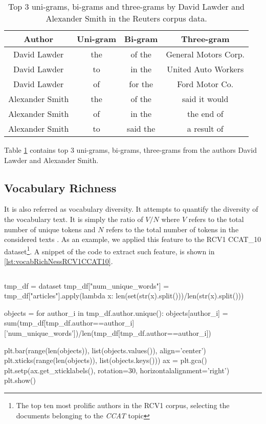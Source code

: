 \begin{table}[h!]
	\begin{center}  
		\caption[Top 3 n-grams in Reuters Corpus]{Top 3 uni-grams, bi-grams and three-grams by David Lawder and Alexander Smith in the Reuters corpus data.} 
		\label{tab:tableNGramsRCV1}
		\begin{tabular}{|c | c | c | c|}
			\hline 
			Author & Uni-gram & Bi-gram & Three-gram \\
			\hline \hline
			David Lawder & the & of the & General Motors Corp. \\ \hline
			David Lawder & to & in the	& United Auto Workers \\ \hline
			David Lawder & of & for the	& Ford Motor Co. \\ \hline
			Alexander Smith & the & of the & said it would \\ \hline
			Alexander Smith & of & in the	& the end of \\ \hline
			Alexander Smith & to & said the	& a result of \\ \hline
		\end{tabular} 
	\end{center}
\end{table}

Table \ref{tab:tableNGramsRCV1} contains top 3 uni-grams, bi-grams, three-grams from the authors David Lawder and Alexander Smith.

\subsection{Vocabulary Richness}
It is also referred as vocabulary diversity. It attempts to quantify the diversity of the vocabulary text. It is simply the ratio of $V / N$ where $V$ refers to the total number of unique tokens and $N$ refers to the total number of tokens in the considered texts \cite{stamatatos2009survey}. As an example, we applied this feature to the RCV1 CCAT\_10 dataset\footnote{The top ten most prolific authors in the RCV1 corpus, selecting the documents belonging to the \textit{CCAT} topic}.
A snippet of the code to extract such feature, is shown in \ref{lst:vocabRichNessRCV1CCAT10}.

\begin{lstlisting}[frame=none,caption={Calculate vocabulary richness in Reuters Corpus Volume 1 CCAT\_10 split dataset.},captionpos=b,label=lst:vocabRichNessRCV1CCAT10]
\end{lstlisting}
\begin{python}	
		tmp_df = dataset
		tmp_df["num_unique_words"] = tmp_df["articles"].apply(lambda x: len(set(str(x).split()))/len(str(x).split()))
		
		objects = {}
		for author_i in tmp_df.author.unique():
			objects[author_i] = sum(tmp_df[tmp_df.author==author_i]['num_unique_words'])/len(tmp_df[tmp_df.author==author_i])
		
		plt.bar(range(len(objects)), list(objects.values()), align='center')
		plt.xticks(range(len(objects)), list(objects.keys()))
		ax = plt.gca()
		plt.setp(ax.get_xticklabels(), rotation=30, horizontalalignment='right')
		plt.show()
\end{python}

